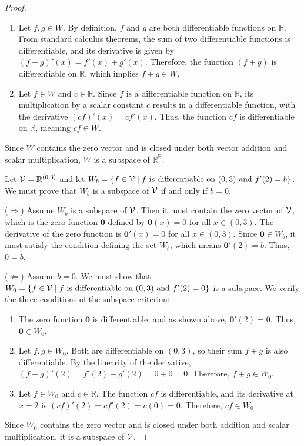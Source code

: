 \begin{proof}
\begin{enumerate}
\begin{enumerate}
			\item {} 
			Let $f, g \in W$. By definition, $f$ and $g$ are both differentiable functions on $\mathbb{R}$. From standard calculus theorems, the sum of two differentiable functions is differentiable, and its derivative is given by $(f + g)'(x) = f'(x) + g'(x)$. Therefore, the function $(f + g)$ is differentiable on $\mathbb{R}$, which implies $f + g \in W$.
			
			\item {} 
			Let $f \in W$ and $c \in \mathbb{R}$. Since $f$ is a differentiable function on $\mathbb{R}$, its multiplication by a scalar constant $c$ results in a differentiable function, with the derivative $(cf)'(x) = c f'(x)$. Thus, the function $cf$ is differentiable on $\mathbb{R}$, meaning $cf \in W$.
		\end{enumerate}
		
		Since $W$ contains the zero vector and is closed under both vector addition and scalar multiplication, $W$ is a subspace of $\mathbb{R}^{\mathbb{R}}$.
	\end{enumerate}
	\item[(d)]
		Let $\mathcal{V} = \mathbb{R}^{(0,3)}$ and let $W_b = \{f \in \mathcal{V} \mid f \text{ is differentiable on } (0,3) \text{ and } f'(2) = b\}$. We must prove that $W_b$ is a subspace of $\mathcal{V}$ if and only if $b = 0$.
		
		($\Rightarrow$) Assume $W_b$ is a subspace of $\mathcal{V}$. Then it must contain the zero vector of $\mathcal{V}$, which is the zero function $\mathbf{0}$ defined by $\mathbf{0}(x) = 0$ for all $x \in (0,3)$. The derivative of the zero function is $\mathbf{0}'(x) = 0$ for all $x \in (0,3)$. Since $\mathbf{0} \in W_b$, it must satisfy the condition defining the set $W_b$, which means $\mathbf{0}'(2) = b$. Thus, $0 = b$.
		
		($\Leftarrow$) Assume $b = 0$. We must show that $W_0 = \{f \in \mathcal{V} \mid f \text{ is differentiable on } (0,3) \text{ and } f'(2) = 0\}$ is a subspace. We verify the three conditions of the subspace criterion:
		\begin{enumerate}
			\item {} The zero function $\mathbf{0}$ is differentiable, and as shown above, $\mathbf{0}'(2) = 0$. Thus, $\mathbf{0} \in W_0$.
			\item {} Let $f, g \in W_0$. Both are differentiable on $(0, 3)$, so their sum $f+g$ is also differentiable. By the linearity of the derivative, $(f + g)'(2) = f'(2) + g'(2) = 0 + 0 = 0$. Therefore, $f + g \in W_0$.
			\item {} Let $f \in W_0$ and $c \in \mathbb{R}$. The function $cf$ is differentiable, and its derivative at $x=2$ is $(cf)'(2) = c f'(2) = c(0) = 0$. Therefore, $cf \in W_0$.
		\end{enumerate}
		Since $W_0$ contains the zero vector and is closed under both addition and scalar multiplication, it is a subspace of $\mathcal{V}$. 
		

\end{proof}
